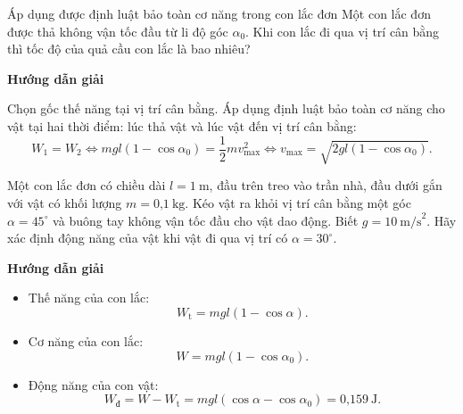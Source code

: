 \begin{dang}{Áp dụng được định luật bảo toàn cơ năng trong con lắc đơn}
	{
		Một con lắc đơn được thả không vận tốc đầu từ li độ góc $\alpha _0$. Khi con lắc đi qua vị trí cân bằng thì tốc độ của quả cầu con lắc là bao nhiêu?
	}
	{\begin{center}
			\textbf{Hướng dẫn giải}
		\end{center}
		
		Chọn gốc thế năng tại vị trí cân bằng. Áp dụng định luật bảo toàn cơ năng cho vật tại hai thời điểm: lúc thả vật và lúc vật đến vị trí cân bằng:
		$$W_1 = W_2 \Leftrightarrow mgl (1- \cos \alpha _0) = \dfrac {1}{2} m v_\text {max}^2 \Leftrightarrow v_\text{max} = \sqrt {2gl (1-\cos \alpha_0)}.$$
	}
	{
		Một con lắc đơn có chiều dài $l = 1\ \text{m}$, đầu trên treo vào trần nhà, đầu dưới gắn với vật có khối lượng $m = \text{0,1}\ \text{kg}$. Kéo vật ra khỏi vị trí cân bằng một góc $\alpha = 45^\circ$ và buông tay không vận tốc đầu cho vật dao động. Biết $g = 10\ \text{m/s}^2$. Hãy xác định động năng của vật khi vật đi qua vị trí có $\alpha = 30^\circ$.
	}
	{
		\begin{center}
			\textbf{Hướng dẫn giải}
		\end{center}
		\begin{itemize}
			\item Thế năng của con lắc:
			\begin{equation*}
				W_{\text{t}} =mgl(1-\cos \alpha).
			\end{equation*}
			\item Cơ năng của con lắc:
			\begin{equation*}
				W=mgl (1-\cos \alpha_0).
			\end{equation*}
			\item Động năng của con vật:
			\begin{equation*}
				W_{\text{đ}} =W-W_{\text{t}} = mgl (\cos \alpha - \cos \alpha_0)= \text{0,159}\ \text{J}.
			\end{equation*}
		\end{itemize}
	}
\end{dang}
